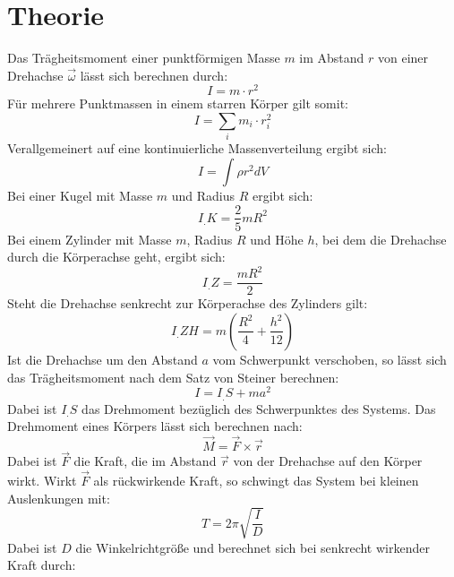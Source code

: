 
\section{Theorie}
\label{sec:Theorie}

Das Trägheitsmoment einer punktförmigen Masse $m$ im Abstand $r$ von einer Drehachse $\vec{\omega}$ lässt sich berechnen durch:
\begin{equation}
I = m\cdot r^2 
\end{equation}
Für mehrere Punktmassen in einem starren Körper gilt somit:
\begin{equation}
I = \sum_i m_i\cdot r_i^2\label{eq:I_S}
\end{equation}
Verallgemeinert auf eine kontinuierliche Massenverteilung ergibt sich:
\begin{equation}
I = \int \rho r^2 dV \label{eq:I_S2}
\end{equation}
Bei einer Kugel mit Masse $m$ und Radius $R$ ergibt sich:
\begin{equation}
I_.{K} = \frac{2}{5}mR^2 \label{eq:I_SK}
\end{equation}
Bei einem Zylinder mit Masse $m$, Radius $R$ und Höhe $h$, bei dem die Drehachse durch die Körperachse geht, ergibt sich:
\begin{equation}
I_.{Z} = \frac{mR^2}{2} \label{eq:I_SZ}
\end{equation}
Steht die Drehachse senkrecht zur Körperachse des Zylinders gilt:
\begin{equation}
I_.{ZH} = m\left(\frac{R^2}{4}+\frac{h^2}{12}\right) \label{eq:I_SZH}
\end{equation}
Ist die Drehachse um den Abstand $a$ vom Schwerpunkt verschoben, so lässt sich das Trägheitsmoment nach dem Satz von Steiner berechnen:
\begin{equation}
I = I_.S+m a^2 \label{eq:Satz von Steiner}
\end{equation}
Dabei ist $I_.S$ das Drehmoment bezüglich des Schwerpunktes des Systems. Das Drehmoment eines Körpers lässt sich berechnen nach:
\begin{equation}
\vec{M} = \vec{F}\times\vec{r} \label{eq;M}
\end{equation}
Dabei ist $\vec{F}$ die Kraft, die im Abstand $\vec{r}$ von der Drehachse auf den Körper wirkt. Wirkt $\vec{F}$ als rückwirkende Kraft, so schwingt das System bei kleinen Auslenkungen mit:
\begin{equation}
T = 2\pi\sqrt{\frac{I}{D}} \label{eq:T}
\end{equation}
Dabei ist $D$ die Winkelrichtgröße und berechnet sich bei senkrecht wirkender Kraft durch: 
